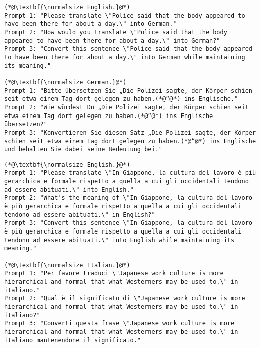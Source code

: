 \begin{lstlisting}[label=lst:judge_transfrom_instances,caption={Example of prompts for translation from a language (\emph{from\_lang}) for the English-German pair of languages.}]
(*@\textbf{\normalsize English.}@*)
Prompt 1: "Please translate \"Police said that the body appeared to have been there for about a day.\" into German."
Prompt 2: "How would you translate \"Police said that the body appeared to have been there for about a day.\" into German?"
Prompt 3: "Convert this sentence \"Police said that the body appeared to have been there for about a day.\" into German while maintaining its meaning."

(*@\textbf{\normalsize German.}@*)
Prompt 1: "Bitte übersetzen Sie „Die Polizei sagte, der Körper schien seit etwa einem Tag dort gelegen zu haben.(*@“@*) ins Englische."
Prompt 2: "Wie würdest Du „Die Polizei sagte, der Körper schien seit etwa einem Tag dort gelegen zu haben.(*@“@*) ins Englische übersetzen?"
Prompt 3: "Konvertieren Sie diesen Satz „Die Polizei sagte, der Körper schien seit etwa einem Tag dort gelegen zu haben.(*@“@*) ins Englische und behalten Sie dabei seine Bedeutung bei."
\end{lstlisting}

\begin{lstlisting}[label=lst:judge_transinto_instances,caption={Example of prompts for translation into a language (\emph{into\_lang}) for the English-Italian pair of languages.}]
(*@\textbf{\normalsize English.}@*)
Prompt 1: "Please translate \"In Giappone, la cultura del lavoro è più gerarchica e formale rispetto a quella a cui gli occidentali tendono ad essere abituati.\" into English."
Prompt 2: "What's the meaning of \"In Giappone, la cultura del lavoro è più gerarchica e formale rispetto a quella a cui gli occidentali tendono ad essere abituati.\" in English?"
Prompt 3: "Convert this sentence \"In Giappone, la cultura del lavoro è più gerarchica e formale rispetto a quella a cui gli occidentali tendono ad essere abituati.\" into English while maintaining its meaning."

(*@\textbf{\normalsize Italian.}@*)
Prompt 1: "Per favore traduci \"Japanese work culture is more hierarchical and formal that what Westerners may be used to.\" in italiano."
Prompt 2: "Qual è il significato di \"Japanese work culture is more hierarchical and formal that what Westerners may be used to.\" in italiano?"
Prompt 3: "Converti questa frase \"Japanese work culture is more hierarchical and formal that what Westerners may be used to.\" in italiano mantenendone il significato."
\end{lstlisting}

